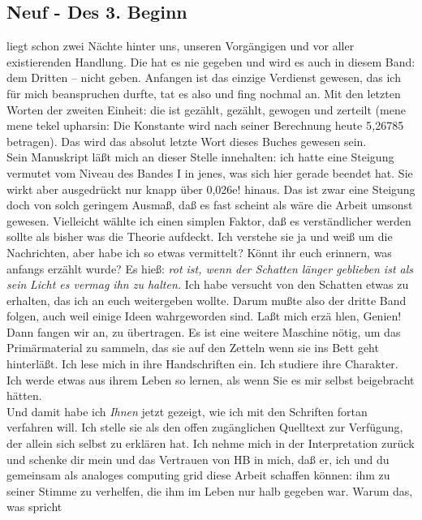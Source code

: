 \documentclass[
]{article}
\author{}
\date{\vspace{-2.5em}}
\begin{document}
\subsection{Neuf - Des 3. Beginn}\label{neuf---des-3.-beginn}

liegt schon zwei Nächte hinter uns, unseren Vorgängigen und vor aller
existierenden Handlung. Die hat es nie gegeben und wird es auch in
diesem Band: dem Dritten -- nicht geben. Anfangen ist das einzige
Verdienst gewesen, das ich für mich beanspruchen durfte, tat es also und
fing nochmal an. Mit den letzten Worten der zweiten Einheit: die ist
gezählt, gezählt, gewogen und zerteilt (mene mene tekel upharsin: Die
Konstante wird nach seiner Berechnung heute 5\emph{,}26785 betragen).
Das wird das absolut letzte Wort dieses Buches gewesen sein.\\
Sein Manuskript läßt mich an dieser Stelle innehalten: ich hatte eine
Steigung vermutet vom Niveau des Bandes I in jenes, was sich hier gerade
beendet hat. Sie wirkt aber ausgedrückt nur knapp über 0,026e! hinaus.
Das ist zwar eine Steigung doch von solch geringem Ausmaß, daß es fast
scheint als wäre die Arbeit umsonst gewesen. Vielleicht wählte ich einen
simplen Faktor, daß es verständlicher werden sollte als bisher was die
Theorie aufdeckt. Ich verstehe sie ja und weiß um die Nachrichten, aber
habe ich so etwas vermittelt? Könnt ihr euch erinnern, was anfangs
erzählt wurde? Es hieß: \emph{rot ist, wenn der Schatten länger
geblieben ist als sein} \emph{Licht es vermag ihn zu halten. }Ich habe
versucht von den Schatten etwas zu erhalten, das ich an euch weitergeben
wollte. Darum mußte also der dritte Band folgen, auch weil einige Ideen
wahrgeworden sind. Laßt mich erzä hlen, Genien!\\
Dann fangen wir an, zu übertragen. Es ist eine weitere Maschine nötig,
um das Primärmaterial zu sammeln, das sie auf den Zetteln wenn sie ins
Bett geht hinterläßt. Ich lese mich in ihre Handschriften ein. Ich
studiere ihre Charakter. Ich werde etwas aus ihrem Leben so lernen, als
wenn Sie es mir selbst beigebracht hätten.\\
Und damit habe ich \emph{Ihnen} jetzt gezeigt, wie ich mit den Schriften
fortan verfahren will. Ich stelle sie als den offen zugänglichen
Quelltext zur Verfügung, der allein sich selbst zu erklären hat. Ich
nehme mich in der Interpretation zurück und schenke dir mein und das
Vertrauen von HB in mich, daß er, ich und du gemeinsam als analoges
computing grid diese Arbeit schaffen können: ihm zu seiner Stimme zu
verhelfen, die ihm im Leben nur halb gegeben war. Warum das, was spricht
\end{document}
